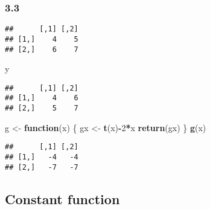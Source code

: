 \documentclass[
]{article}
\newenvironment{Shaded}{\begin{snugshade}}{\end{snugshade}}
\newcommand{\CommentTok}[1]{\textcolor[rgb]{0.56,0.35,0.01}{\textit{#1}}}
\newcommand{\ControlFlowTok}[1]{\textcolor[rgb]{0.13,0.29,0.53}{\textbf{#1}}}
\newcommand{\DecValTok}[1]{\textcolor[rgb]{0.00,0.00,0.81}{#1}}
\newcommand{\KeywordTok}[1]{\textcolor[rgb]{0.13,0.29,0.53}{\textbf{#1}}}
\newcommand{\NormalTok}[1]{#1}
\newcommand{\OperatorTok}[1]{\textcolor[rgb]{0.81,0.36,0.00}{\textbf{#1}}}
\newcommand{\OtherTok}[1]{\textcolor[rgb]{0.56,0.35,0.01}{#1}}
\newcommand{\StringTok}[1]{\textcolor[rgb]{0.31,0.60,0.02}{#1}}
\begin{document}
\hypertarget{section-5}{%
\subsubsection{3.3}\label{section-5}}

\begin{Shaded}
\end{Shaded}

\begin{verbatim}
##      [,1] [,2]
## [1,]    4    5
## [2,]    6    7
\end{verbatim}

\begin{Shaded}
\begin{Highlighting}[]
\NormalTok{y}
\end{Highlighting}
\end{Shaded}

\begin{verbatim}
##      [,1] [,2]
## [1,]    4    6
## [2,]    5    7
\end{verbatim}

\begin{Shaded}
\begin{Highlighting}[]
\NormalTok{g <-}\StringTok{ }\ControlFlowTok{function}\NormalTok{(x) \{}
\NormalTok{  gx <-}\StringTok{ }\KeywordTok{t}\NormalTok{(x)}\OperatorTok{-}\DecValTok{2}\OperatorTok{*}\NormalTok{x}
  \KeywordTok{return}\NormalTok{(gx)}
\NormalTok{\}}
\KeywordTok{g}\NormalTok{(x)}
\end{Highlighting}
\end{Shaded}

\begin{verbatim}
##      [,1] [,2]
## [1,]   -4   -4
## [2,]   -7   -7
\end{verbatim}

\hypertarget{constant-function}{%
\subsection{Constant function}\label{constant-function}}
\end{document}
